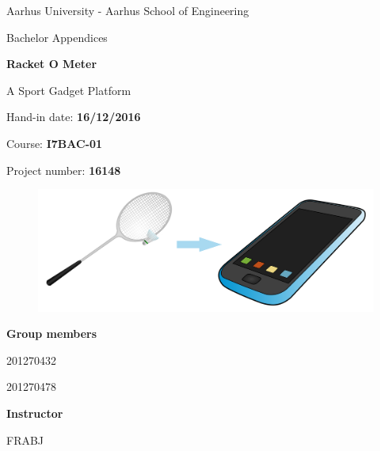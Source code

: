 \begin{titlingpage}

\centering 

Aarhus University - Aarhus School of Engineering

\vspace{0.6cm}

{\huge Bachelor Appendices}

\vspace{1cm}

{\Huge \textbf{Racket O Meter}}

{\LARGE A Sport Gadget Platform}
\vspace{0.6cm}

Hand-in date: \textbf{16/12/2016}

Course: \textbf{I7BAC-01}

Project number: \textbf{16148}
\vspace{1.8cm}

\begin{figure}[H] \centering
        \includegraphics[width=1\textwidth]{graphics/FrontpPic_v3}
    \end{figure}

\vspace{1.2cm}

\textbf{Group members}

\signature{Bjørn Sørensen}{201270432}
\signature{Jesper Christensen}{201270478}

\vspace{0.5cm}

\textbf{Instructor}
\signature{Frank Bodholdt Jakobsen}{FRABJ}

\end{titlingpage}
